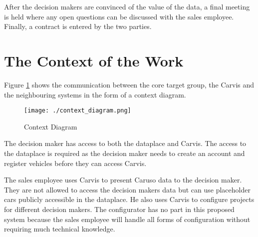 After the decision makers are convinced of the value of the data, a final meeting is held where any open questions can be discussed with the sales employee. Finally, a contract is entered by the two parties.

\section{The Context of the Work}
Figure \ref*{ScopeOfWork:ContextDiagram} shows the communication between the core target group, the Carvis and the neighbouring systems in the form of a context diagram.

\begin{figure}[ht]
  \centering
  \texttt{[image: ./context\_diagram.png]}
  \caption{Context Diagram}
  \label{ScopeOfWork:ContextDiagram}
\end{figure}

The decision maker has access to both the \gls{dataplace} and Carvis. The access to the \gls{dataplace} is required as the decision maker needs to create an account and register vehicles before they can access Carvis.

The sales employee uses Carvis to present Caruso data to the decision maker. They are not allowed to access the decision makers data but can use placeholder cars publicly accessible in the \gls{dataplace}. He also uses Carvis to configure projects for different decision makers. The configurator has no part in this proposed system because the sales employee will handle all forms of configuration without requiring much technical knowledge.
